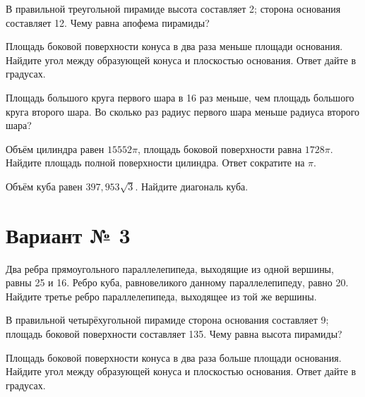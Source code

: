 \documentclass[4apaper]{article}
\begin{document}
\begin{taskBN}{2}
В правильной треугольной пирамиде высота составляет 2; сторона основания составляет 12. Чему равна апофема пирамиды?
\end{taskBN}

\begin{taskBN}{3}
Площадь боковой поверхности конуса в два раза меньше площади основания. Найдите угол между образующей конуса и плоскостью основания. Ответ дайте в градусах.
\end{taskBN}

\begin{taskBN}{4}
Площадь большого круга первого шара в 16 раз меньше, чем площадь большого круга второго шара. Во сколько раз радиус первого шара меньше радиуса второго шара?
\end{taskBN}

\begin{taskBN}{5}
Объём цилиндра равен $15552\pi$, площадь боковой поверхности равна $1728\pi$. Найдите площадь полной поверхности цилиндра. Ответ сократите на $\pi$.
\end{taskBN}

\begin{taskBN}{6}
Объём куба равен $397,953\sqrt{3}$. Найдите диагональ куба.
\end{taskBN}
\newpage\section*{Вариант № 3}

\begin{taskBN}{1}
Два ребра прямоугольного параллелепипеда, выходящие из одной вершины, равны 25 и 16. Ребро куба, равновеликого данному параллелепипеду, равно 20. Найдите третье ребро параллелепипеда, выходящее из той же вершины.
\end{taskBN}

\begin{taskBN}{2}
В правильной четырёхугольной пирамиде сторона основания составляет 9; площадь боковой поверхности составляет 135. Чему равна высота пирамиды?
\end{taskBN}

\begin{taskBN}{3}
Площадь боковой поверхности конуса в два раза больше площади основания. Найдите угол между образующей конуса и плоскостью основания. Ответ дайте в градусах.
\end{taskBN}
\end{document}
